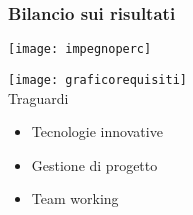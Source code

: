 \begin{frame}
\frametitle{Bilancio sui risultati}

\begin{minipage}[c]{.45\textwidth}
\centering 
\texttt{[image: impegnoperc]}
\end{minipage}
\begin{minipage}[c]{.45\textwidth}
\texttt{[image: graficorequisiti]}\\
Traguardi
\begin{itemize}
\item Tecnologie innovative
\item Gestione di progetto
\item Team working
\end{itemize}
\end{minipage}




\end{frame}